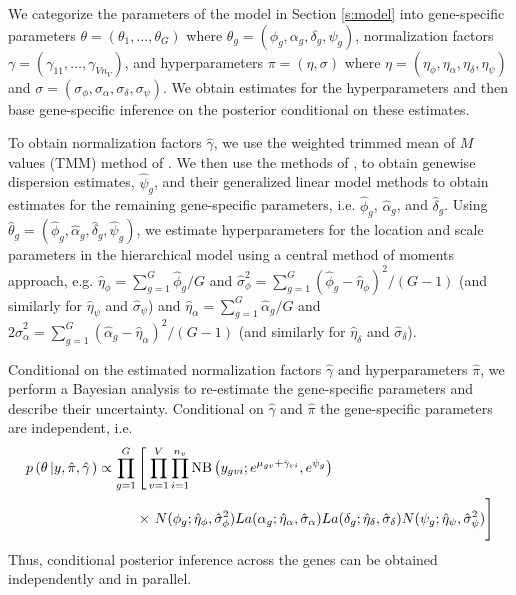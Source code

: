 \documentclass[useAMS,usenatbib,referee]{biom}
\begin{document}
We categorize the parameters of the model in Section \ref{s:model} into gene-specific parameters $\theta = (\theta_1,\ldots,\theta_G)$ where $\theta_g = (\phi_g,\alpha_g,\delta_g,\psi_g)$, normalization factors $\gamma = (\gamma_{11},\ldots,\gamma_{Vn_V})$, and hyperparameters $\pi = (\eta, \sigma)$ where $\eta=(\eta_\phi,\eta_\alpha,\eta_\delta, \eta_\psi)$ and $\sigma=(\sigma_\phi,\sigma_\alpha,\sigma_\delta,\sigma_\psi)$. We obtain estimates for the hyperparameters and then base gene-specific inference on the posterior conditional on these estimates. 

To obtain normalization factors $\hat{\gamma}$, we use the weighted trimmed mean of $M$ values (TMM) method of \cite{robinson2010scaling}. We then use the methods of \cite{mccarthy2012differential}, to obtain genewise dispersion estimates, $\hat{\psi}_g$, and their generalized linear model methods to obtain estimates for the remaining gene-specific parameters, i.e. $\hat{\phi}_g$, $\hat{\alpha}_g$, and $\hat{\delta}_g$. Using $\hat{\theta}_g = (\hat{\phi}_g,\hat{\alpha}_g,\hat{\delta}_g,\hat{\psi}_g)$, we estimate hyperparameters for the location and scale parameters in the hierarchical model using a central method of moments approach, e.g. $\hat{\eta}_\phi = \sum_{g=1}^G \hat{\phi}_g/G$ and $\hat{\sigma}_\phi^2 = \sum_{g=1}^G (\hat{\phi}_g - \hat{\eta}_\phi)^2/(G-1)$ (and similarly for $\hat{\eta}_\psi$ and $\hat{\sigma}_\psi$) and $\hat{\eta}_\alpha = \sum_{g=1}^G \hat{\alpha}_g/G$ and $2\hat{\sigma}_\alpha^2 = \sum_{g=1}^G (\hat{\alpha}_g - \hat{\eta}_\alpha)^2/(G-1)$ (and similarly for $\hat{\eta}_\delta$ and $\hat{\sigma}_\delta$). 

Conditional on the estimated normalization factors $\hat{\gamma}$ and hyperparameters $\hat{\pi}$, we perform a Bayesian analysis to re-estimate the gene-specific parameters and describe their uncertainty. Conditional on $\hat{\gamma}$ and $\hat{\pi}$ the gene-specific parameters are independent, i.e.
\begin{equation}
\begin{split}
p\left(\theta\left|y,\hat{\pi},\hat{\gamma}\right.\right) 
\propto \prod_{g=1}^G & \left[ \,\prod_{v=1}^V \prod_{i=1}^{n_v} \mbox{NB}\left(y_{gvi};e^{\mu_{gv}+\hat{\gamma}_{vi}},e^{\psi_g}\right)  \right. \\
&\times 
\left. \vphantom{\prod_{v=1}^V}
N(\phi_g;\hat{\eta}_\phi, \hat{\sigma}_\phi^2)
La(\alpha_g;\hat{\eta}_\alpha, \hat{\sigma}_\alpha)
La(\delta_g;\hat{\eta}_\delta, \hat{\sigma}_\delta)
N(\psi_g;\hat{\eta}_\psi, \hat{\sigma}_\psi^2) 
\right]
\label{e:condind}
\end{split}
\end{equation}
Thus, conditional posterior inference across the genes can be obtained independently and in parallel.
\end{document}
